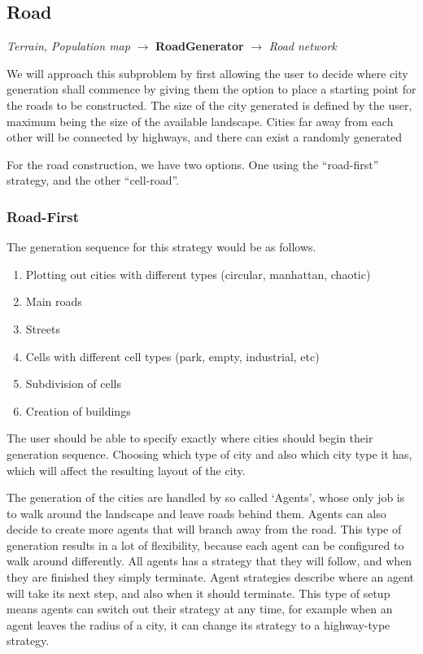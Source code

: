 \subsection{Road}
\begin{center}
  \textit{Terrain, Population map} $\rightarrow$ \textbf{RoadGenerator} $\rightarrow$ \textit{Road network} 
\end{center}
We will approach this subproblem by first allowing the user to decide where city generation shall commence by giving them the option to place a starting point for the roads to be constructed.
The size of the city generated is defined by the user, maximum being the size of the available landscape.
Cities far away from each other will be connected by highways, and there can exist a randomly generated 

For the road construction, we have two options.
One using the “road-first” strategy, and the other “cell-road”.

\subsubsection{Road-First}
The generation sequence for this strategy would be as follows.
\begin{enumerate}
  \item Plotting out cities with different types (circular, manhattan, chaotic)
  \item Main roads
  \item Streets
  \item Cells with different cell types (park, empty, industrial, etc)
  \item Subdivision of cells
  \item Creation of buildings
\end{enumerate}

The user should be able to specify exactly where cities should begin their generation sequence.
Choosing which type of city
and also which city type it has, which will affect the resulting layout of the city.

The generation of the cities are handled by so called `Agents', whose only job is to walk around the landscape and leave roads behind them.
Agents can also decide to create more agents that will branch away from the road.
This type of generation results in a lot of flexibility, because each agent can be configured to walk around differently.
All agents has a strategy that they will follow, and when they are finished they simply terminate.
Agent strategies describe where an agent will take its next step, and also when it should terminate.
This type of setup means agents can switch out their strategy at any time, for example when an agent leaves the radius of a city, it can change its strategy to a highway-type strategy.

